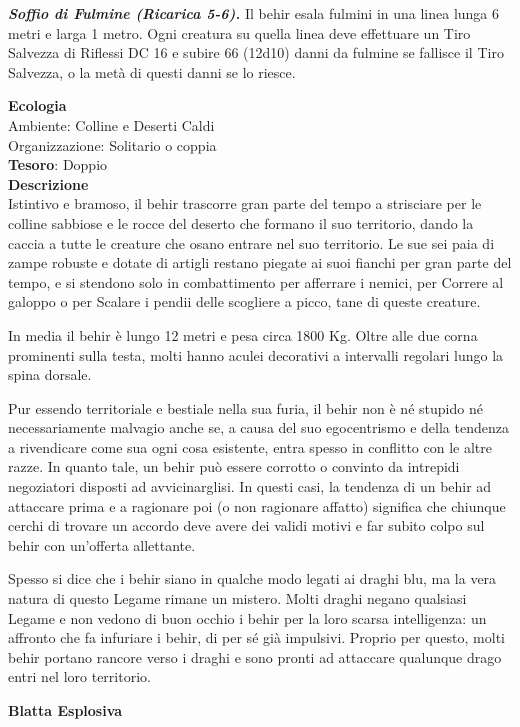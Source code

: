 \begin{multicols}{2}
\textit{\textbf{Soffio di Fulmine (Ricarica 5-6).}} Il behir esala fulmini in una linea lunga 6 metri e larga 1 metro. Ogni creatura su quella linea deve effettuare un Tiro Salvezza di Riflessi DC 16 e subire 66 (12d10) danni da fulmine se fallisce il Tiro Salvezza, o la metà di questi danni se lo riesce.

\textbf{Ecologia}\\
Ambiente: Colline e Deserti Caldi\\
Organizzazione: Solitario o coppia\\
\textbf{Tesoro}: Doppio\\
\textbf{Descrizione}\\
Istintivo e bramoso, il behir trascorre gran parte del tempo a strisciare per le colline sabbiose e le rocce del deserto che formano il suo territorio, dando la caccia a tutte le creature che osano entrare nel suo territorio. Le sue sei paia di zampe robuste e dotate di artigli restano piegate ai suoi fianchi per gran parte del tempo, e si stendono solo in combattimento per afferrare i nemici, per Correre al galoppo o per Scalare i pendii delle scogliere a picco, tane di queste creature.

In media il behir è lungo 12 metri e pesa circa 1800 Kg. Oltre alle due corna prominenti sulla testa, molti hanno aculei decorativi a intervalli regolari lungo la spina dorsale.

Pur essendo territoriale e bestiale nella sua furia, il behir non è né stupido né necessariamente malvagio anche se, a causa del suo egocentrismo e della tendenza a rivendicare come sua ogni cosa esistente, entra spesso in conflitto con le altre razze. In quanto tale, un behir può essere corrotto o convinto da intrepidi negoziatori disposti ad avvicinarglisi. In questi casi, la tendenza di un behir ad attaccare prima e a ragionare poi (o non ragionare affatto) significa che chiunque cerchi di trovare un accordo deve avere dei validi motivi e far subito colpo sul behir con un'offerta allettante.

Spesso si dice che i behir siano in qualche modo legati ai draghi blu, ma la vera natura di questo Legame rimane un mistero. Molti draghi negano qualsiasi Legame e non vedono di buon occhio i behir per la loro scarsa intelligenza: un affronto che fa infuriare i behir, di per sé già impulsivi. Proprio per questo, molti behir portano rancore verso i draghi e sono pronti ad attaccare qualunque drago entri nel loro territorio.

\medskip{}\textbf{Blatta Esplosiva}


\end{multicols}
